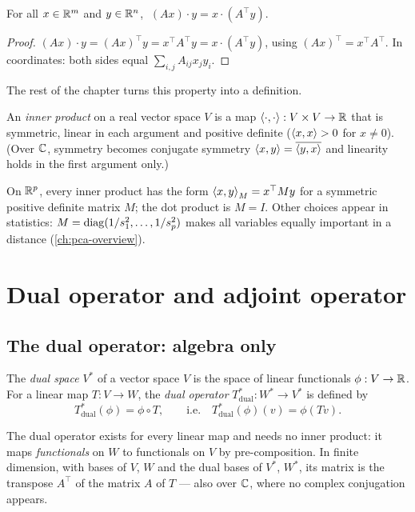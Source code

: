 \begin{notechapter}
\begin{proposition}\label{adjoint-operator:prop:transpose}
For all $x\in\mathbb{R}^m$ and $y\in\mathbb{R}^n$, $\;(Ax)\cdot y = x\cdot(A^\top y)$.
\end{proposition}

\begin{proof}
$(Ax)\cdot y = (Ax)^\top y = x^\top A^\top y = x\cdot(A^\top y)$, using $(Ax)^\top = x^\top A^\top$.
In coordinates: both sides equal $\sum_{i,j}A_{ij}x_jy_i$.
\end{proof}

The rest of the chapter turns this property into a definition.

\begin{definition}
An \emph{inner product} on a real vector space $V$ is a map
$\left\langle \cdot, \cdot \right\rangle:V\times V\to\mathbb{R}$ that is symmetric, linear in each argument and
positive definite ($\left\langle x, x \right\rangle>0$ for $x\neq0$). (Over $\mathbb{C}$, symmetry becomes
conjugate symmetry $\left\langle x, y \right\rangle = \overline{\left\langle y, x \right\rangle}$ and linearity holds in the first
argument only.)
\end{definition}

On $\mathbb{R}^p$, every inner product has the form $\left\langle x, y \right\rangle_M = x^\top My$ for a symmetric
positive definite matrix $M$; the dot product is $M = I$. Other choices appear in
statistics: $M = \operatorname{diag}(1/s_1^2,\dots,1/s_p^2)$ makes all variables equally important
in a distance (\cref{ch:pca-overview}).

\section{Dual operator and adjoint operator}\label{adjoint-operator:sec:dual-adjoint}

\subsection{The dual operator: algebra only}

\begin{definition}
The \emph{dual space} $V^*$ of a vector space $V$ is the space of linear functionals
$\phi:V\to\mathbb{R}$. For a linear map $T:V\to W$, the \emph{dual operator}
$T^*_{\text{dual}}:W^*\to V^*$ is defined by
\[
  T^*_{\text{dual}}(\phi) = \phi\circ T,\qquad\text{i.e.}\quad T^*_{\text{dual}}(\phi)(v) = \phi(T v).
\]
\end{definition}

The dual operator exists for every linear map and needs no inner product: it maps
\emph{functionals} on $W$ to functionals on $V$ by pre-composition. In finite
dimension, with bases of $V$, $W$ and the dual bases of $V^*$, $W^*$, its matrix is the
transpose $A^\top$ of the matrix $A$ of $T$ --- also over $\mathbb{C}$, where no complex
conjugation appears.


\end{notechapter}
